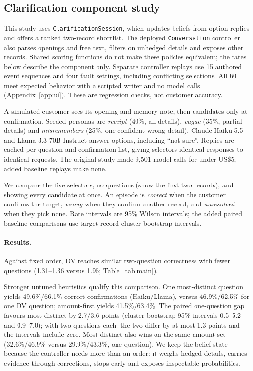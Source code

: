 \documentclass[11pt]{article}
\begin{document}
\subsection{Clarification component study}

This study uses \texttt{ClarificationSession}, which updates beliefs from option replies and
offers a ranked two-record shortlist. The deployed \texttt{Conversation} controller also parses
openings and free text, filters on unhedged details and exposes other records. Shared scoring
functions do not make these policies equivalent; the rates below describe the component only.
Separate controller replays use 15 authored event sequences and four fault settings, including
conflicting selections. All 60 meet expected behavior with a scripted writer and no model calls
(Appendix~\ref{app:ui}). These are regression checks, not customer accuracy.

A simulated customer sees its opening and memory note, then candidates only at confirmation.
Seeded personas are \emph{receipt} (40\%, all details), \emph{vague} (35\%, partial details) and
\emph{misremembers} (25\%, one confident wrong detail). Claude Haiku 5.5 and Llama 3.3 70B
Instruct answer options, including ``not sure''. Replies are cached per question and confirmation
list, giving selectors identical responses to identical requests. The original study made 9,501
model calls for under US\$5; added baseline replays make none.

We compare the five selectors, no questions (show the first two records), and showing every
candidate at once. An episode is \emph{correct}
when the customer confirms the target, \emph{wrong} when they confirm another record, and
\emph{unresolved} when they pick none. Rate intervals are 95\% Wilson intervals; the added
paired baseline comparisons use target-record-cluster bootstrap intervals.



\paragraph{Results.}
Against fixed order, DV reaches similar two-question correctness with fewer questions
(1.31--1.36 versus 1.95; Table~\ref{tab:main}).

Stronger untuned heuristics qualify this comparison. One most-distinct question yields
49.6\%/66.1\% correct confirmations (Haiku/Llama), versus 46.9\%/62.5\% for one DV question;
amount-first yields 41.5\%/63.4\%. The paired one-question gap favours most-distinct by
2.7/3.6 points (cluster-bootstrap 95\% intervals 0.5--5.2 and 0.9--7.0); with two questions
each, the two differ by at most 1.3 points and the intervals include zero. Most-distinct also
wins on the same-amount set (32.6\%/46.9\% versus 29.9\%/43.3\%, one question).
We keep the belief state because the controller needs more than an order: it weighs hedged
details, carries evidence through corrections, stops early and exposes inspectable probabilities.
\end{document}
